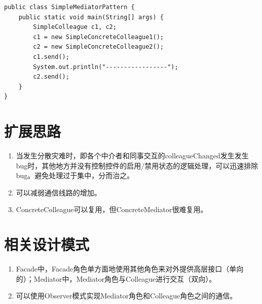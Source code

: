 \begin{lstlisting}
public class SimpleMediatorPattern {
	public static void main(String[] args) {
		SimpleColleague c1, c2;
		c1 = new SimpleConcreteColleague1();
		c2 = new SimpleConcreteColleague2();
		c1.send();
		System.out.println("-----------------");
		c2.send();
	}
}
\end{lstlisting}
\section{扩展思路}
\begin{enumerate}
	\item 当发生分散灾难时，即各个中介者和同事交互的colleagueChanged发生发生bug时，其他地方并没有控制控件的启用/禁用状态的逻辑处理，可以迅速排除bug。避免处理过于集中，分而治之。
	\item 可以减弱通信线路的增加。
	\item ConcreteColleague可以复用，但ConcreteMediator很难复用。
\end{enumerate}
\section{相关设计模式}
\begin{enumerate}
	\item Facade中，Facade角色单方面地使用其他角色来对外提供高层接口（单向的）；Mediator中，Mediator角色与Colleague进行交互（双向）。
	\item 可以使用Observer模式实现Mediator角色和Colleague角色之间的通信。
\end{enumerate}